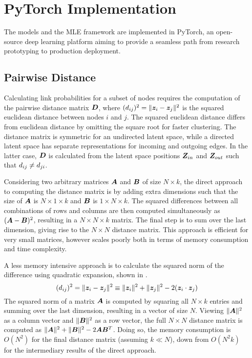 \section{PyTorch Implementation}

The models and the MLE framework are implemented in PyTorch, an open-source deep learning platform aiming to provide a seamless path from research prototyping to production deployment. %

\subsection{Pairwise Distance}

    Calculating link probabilities for a subset of nodes requires the computation of the pairwise distance matrix $\bm{D}$, where $(\sub(d))^2=\Vert \z_i-\z_j\Vert^2$ is the squared euclidean distance between nodes $i$ and $j$. The squared euclidean distance differs from euclidean distance by omitting the square root for faster clustering. The distance matrix is symmetric for an undirected latent space, while a directed latent space has separate representations for incoming and outgoing edges. In the latter case, $\bm{D}$ is calculated from the latent space positions $\bm{Z}_{in}$ and $\bm{Z}_{out}$ such that $\sub(d)\neq\sub(d)(ji)$.
    
    Considering two arbitrary matrices $\bm{A}$ and $\bm{B}$ of size $N\times k$, the direct approach to computing the distance matrix is by adding extra dimensions such that the size of $\bm{A}$ is $N\times 1\times k$ and $\bm{B}$ is $1\times N\times k$. The squared differences between all combinations of rows and columns are then computed simultaneously as $(\bm{A}-\bm{B})^2$, resulting in a $N\times N\times k$ matrix. The final step is to sum over the last dimension, giving rise to the $N\times N$ distance matrix. This approach is efficient for very small matrices, however scales poorly both in terms of memory consumption and time complexity.
    
    A less memory intensive approach is to calculate the squared norm of the difference using quadratic expansion, shown in .
    \begin{equation}\label{eq:pyimpl-dist-quadratic}
        (\sub(d))^2=\Vert \z_i-\z_j\Vert^2\equiv\Vert \z_i\Vert^2 + \Vert \z_j\Vert^2 - 2(\z_i\cdot \z_j)
    \end{equation}
    The squared norm of a matrix $\bm{A}$ is computed by squaring all $N\times k$ entries and summing over the last dimension, resulting in a vector of size $N$. Viewing $\Vert \bm{A}\Vert^2$ as a column vector and $\Vert \bm{B}\Vert^2$ as a row vector, the full $N\times N$ distance matrix is computed as $\Vert \bm{A}\Vert^2 + \Vert \bm{B}\Vert^2 - 2\bm{A}\bm{B}^T$. Doing so, the memory consumption is $O(N^2)$ for the final distance matrix (assuming $k\ll N$), down from $O(N^2k)$ for the intermediary results of the direct approach.
    
